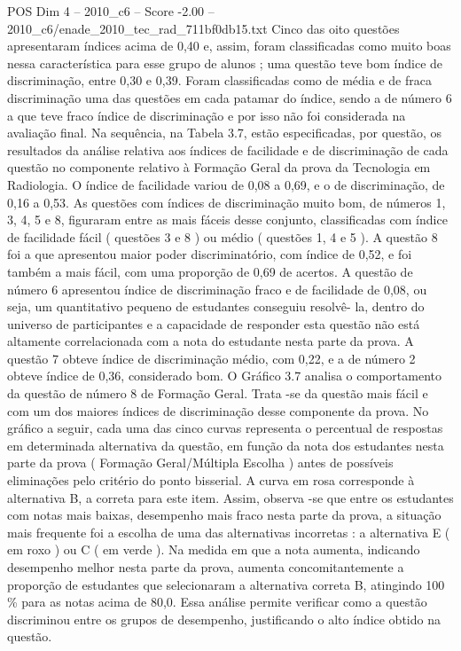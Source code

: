 \begin{textsample}{POS Dim 4 – 2010\_c6 – Score -2.00 – 2010\_c6/enade\_2010\_tec\_rad\_711bf0db15.txt}
Cinco das oito questões apresentaram índices acima de 0,40 e, assim, foram classificadas como muito boas nessa característica para esse grupo de alunos ; uma questão teve bom índice de discriminação, entre 0,30 e 0,39.
Foram classificadas como de média e de fraca discriminação uma das questões em cada patamar do índice, sendo a de número 6 a que teve fraco índice de discriminação e por isso não foi considerada na avaliação final.
Na sequência, na Tabela 3.7, estão especificadas, por questão, os resultados da análise relativa aos índices de facilidade e de discriminação de cada questão no componente relativo à Formação Geral da prova da Tecnologia em Radiologia.
O índice de facilidade variou de 0,08 a 0,69, e o de discriminação, de 0,16 a 0,53.
As questões com índices de discriminação muito bom, de números 1, 3, 4, 5 e 8, figuraram entre as mais fáceis desse conjunto, classificadas com índice de facilidade fácil ( questões 3 e 8 ) ou médio ( questões 1, 4 e 5 ).
A questão 8 foi a que apresentou maior poder discriminatório, com índice de 0,52, e foi também a mais fácil, com uma proporção de 0,69 de acertos.
A questão de número 6 apresentou índice de discriminação fraco e de facilidade de 0,08, ou seja, um quantitativo pequeno de estudantes conseguiu resolvê- la, dentro do universo de participantes e a capacidade de responder esta questão não está altamente correlacionada com a nota do estudante nesta parte da prova.
A questão 7 obteve índice de discriminação médio, com 0,22, e a de número 2 obteve índice de 0,36, considerado bom.
O Gráfico 3.7 analisa o comportamento da questão de número 8 de Formação Geral.
Trata -se da questão mais fácil e com um dos maiores índices de discriminação desse componente da prova.
No gráfico a seguir, cada uma das cinco curvas representa o percentual de respostas em determinada alternativa da questão, em função da nota dos estudantes nesta parte da prova ( Formação Geral/Múltipla Escolha ) antes de possíveis eliminações pelo critério do ponto bisserial.
A curva em rosa corresponde à alternativa B, a correta para este item.
Assim, observa -se que entre os estudantes com notas mais baixas, desempenho mais fraco nesta parte da prova, a situação mais frequente foi a escolha de uma das alternativas incorretas : a alternativa E ( em roxo ) ou C ( em verde ).
Na medida em que a nota aumenta, indicando desempenho melhor nesta parte da prova, aumenta concomitantemente a proporção de estudantes que selecionaram a alternativa correta B, atingindo 100 \% para as notas acima de 80,0.
Essa análise permite verificar como a questão discriminou entre os grupos de desempenho, justificando o alto índice obtido na questão.

\end{textsample}
